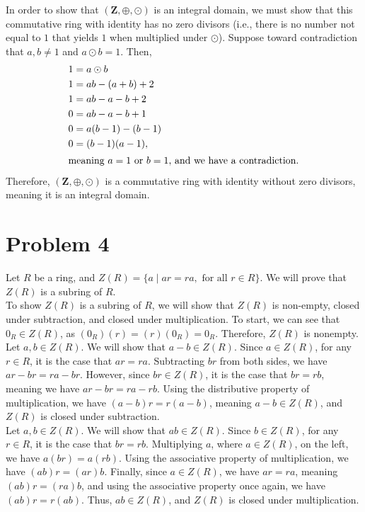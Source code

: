 \documentclass[10pt]{extarticle}
\begin{document}
  In order to show that $(\mathbf{Z},\oplus,\odot)$ is an integral domain, we must show that this commutative ring with identity has no zero divisors (i.e., there is no number not equal to $1$ that yields $1$ when multiplied under $\odot$). Suppose toward contradiction that $a,b\neq 1$ and $a\odot b = 1$. Then,
  \begin{align*}
    1 &= a\odot b\\
    1&= ab - (a+b) + 2\\
           1 &= ab - a - b + 2\\
           0 &= ab - a - b + 1\\
           0 &= a(b-1) - (b-1)\\
           0 &= (b-1)(a-1),\\
           \shortintertext{meaning $a=1$ or $b=1$, and we have a contradiction.}
  \end{align*}
  Therefore, $(\mathbf{Z},\oplus,\odot)$ is a commutative ring with identity without zero divisors, meaning it is an integral domain.
  \section{Problem 4}%
  Let $R$ be a ring, and $Z(R) = \{a\mid ar = ra,\text{ for all }r\in R\}$. We will prove that $Z(R)$ is a subring of $R$.\\

  To show $Z(R)$ is a subring of $R$, we will show that $Z(R)$ is non-empty, closed under subtraction, and closed under multiplication. To start, we can see that $0_R\in Z(R)$, as $(0_R)(r) = (r)(0_R) = 0_R$. Therefore, $Z(R)$ is nonempty.\\

  Let $a,b\in Z(R)$. We will show that $a-b\in Z(R)$. Since $a\in Z(R)$, for any $r\in R$, it is the case that $ar = ra$. Subtracting $br$ from both sides, we have $ar-br = ra - br$. However, since $br \in Z(R)$, it is the case that $br = rb$, meaning we have $ar - br = ra - rb$. Using the distributive property of multiplication, we have $(a-b)r = r(a-b)$, meaning $a-b\in Z(R)$, and $Z(R)$ is closed under subtraction.\\

  Let $a,b\in Z(R)$. We will show that $ab\in Z(R)$. Since $b\in Z(R)$, for any $r\in R$, it is the case that $br = rb$. Multiplying $a$, where $a\in Z(R)$, on the left, we have $a(br) = a(rb)$. Using the associative property of multiplication, we have $(ab)r = (ar)b$. Finally, since $a\in Z(R)$, we have $ar = ra$, meaning $(ab)r = (ra)b$, and using the associative property once again, we have $(ab)r = r(ab)$. Thus, $ab\in Z(R)$, and $Z(R)$ is closed under multiplication.\\
\end{document}
